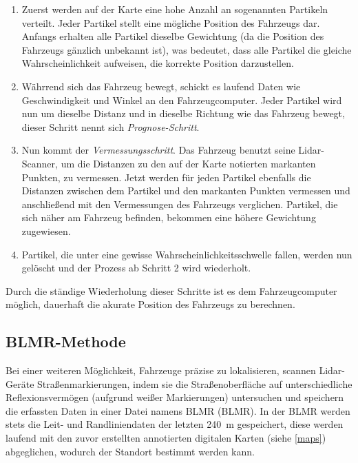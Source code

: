 \begin{enumerate}
  \item{Zuerst werden auf der Karte eine hohe Anzahl an sogenannten Partikeln verteilt. Jeder Partikel stellt eine mögliche Position des Fahrzeugs dar. Anfangs erhalten alle Partikel dieselbe Gewichtung (da die Position des Fahrzeugs gänzlich unbekannt ist), was bedeutet, dass alle Partikel die gleiche Wahrscheinlichkeit aufweisen, die korrekte Position darzustellen.}

  \item{Währrend sich das Fahrzeug bewegt, schickt es laufend Daten wie Geschwindigkeit und Winkel an den Fahrzeugcomputer. Jeder Partikel wird nun um dieselbe Distanz und in dieselbe Richtung wie das Fahrzeug bewegt, dieser Schritt nennt sich \emph{Prognose-Schritt}}.

  \item{Nun kommt der \emph{Vermessungsschritt}. Das Fahrzeug benutzt seine \acs{Lidar}-Scanner}, um die Distanzen zu den auf der Karte notierten markanten Punkten, zu vermessen. Jetzt werden für jeden Partikel ebenfalls die Distanzen zwischen dem Partikel und den markanten Punkten vermessen und anschließend mit den Vermessungen des Fahrzeugs verglichen. Partikel, die sich näher am Fahrzeug befinden, bekommen eine höhere Gewichtung zugewiesen.

  \item{Partikel, die unter eine gewisse Wahrscheinlichkeitsschwelle fallen, werden nun gelöscht und der Prozess ab Schritt 2 wird wiederholt.}
\end{enumerate}

Durch die ständige Wiederholung dieser Schritte ist es dem Fahrzeugcomputer möglich, dauerhaft die akurate Position des Fahrzeugs zu berechnen.

\subsection{BLMR-Methode}

Bei einer weiteren Möglichkeit, Fahrzeuge präzise zu lokalisieren, scannen \acs{Lidar}-Geräte Straßenmarkierungen, indem sie die Straßenoberfläche auf unterschiedliche Reflexionsvermögen (aufgrund weißer Markierungen) untersuchen und speichern die erfassten Daten in einer Datei namens \acs{BLMR} (\acl{BLMR}). In der \acs{BLMR} werden stets die Leit- und Randliniendaten der letzten \SI{240}{\meter} gespeichert, diese werden laufend mit den zuvor erstellten annotierten digitalen Karten (siehe \ref{maps}) abgeglichen, wodurch der Standort bestimmt werden kann. 

